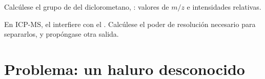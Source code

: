 \begin{exercise}[$\star\star\star$]\label{exo:b2:mass-spec-atomic:11}
Calcúlese el grupo de  del diclorometano, : valores de $m/z$ e intensidades
relativas.
\end{exercise}

\begin{exercise}[$\star\star\star$]\label{exo:b2:mass-spec-atomic:12}
En ICP-MS, el  interfiere con el . Calcúlese el poder de resolución necesario para
separarlos, y propóngase otra salida.
\end{exercise}

\section{Problema: un haluro desconocido}

